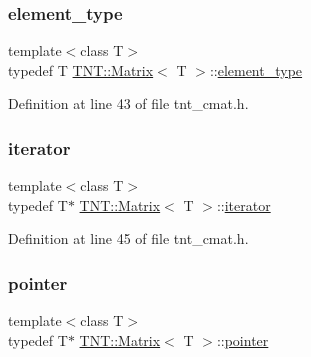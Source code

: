 \mbox{\label{classTNT_1_1Matrix_a8ecf0a648bbfaf636fd78c21b35a0a4d}} 
\subsubsection{\texorpdfstring{element\+\_\+type}{element\_type}}
{\footnotesize\ttfamily template$<$class T$>$ \\
typedef T \hyperlink{classTNT_1_1Matrix}{T\+N\+T\+::\+Matrix}$<$ T $>$\+::\hyperlink{classTNT_1_1Matrix_a8ecf0a648bbfaf636fd78c21b35a0a4d}{element\+\_\+type}}



Definition at line 43 of file tnt\+\_\+cmat.\+h.

\mbox{\label{classTNT_1_1Matrix_a8233a1d03d4cfeab1d7cfec560cd2f0c}} 
\subsubsection{\texorpdfstring{iterator}{iterator}}
{\footnotesize\ttfamily template$<$class T$>$ \\
typedef T$\ast$ \hyperlink{classTNT_1_1Matrix}{T\+N\+T\+::\+Matrix}$<$ T $>$\+::\hyperlink{classTNT_1_1Matrix_a8233a1d03d4cfeab1d7cfec560cd2f0c}{iterator}}



Definition at line 45 of file tnt\+\_\+cmat.\+h.

\mbox{\label{classTNT_1_1Matrix_aa7db7adc5513f7d8bf067965b97d7c42}} 
\subsubsection{\texorpdfstring{pointer}{pointer}}
{\footnotesize\ttfamily template$<$class T$>$ \\
typedef T$\ast$ \hyperlink{classTNT_1_1Matrix}{T\+N\+T\+::\+Matrix}$<$ T $>$\+::\hyperlink{classTNT_1_1Matrix_aa7db7adc5513f7d8bf067965b97d7c42}{pointer}}



